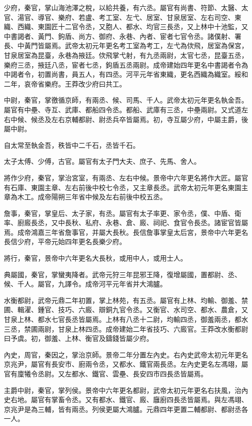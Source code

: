 \begin{pinyinscope}
少府，秦官，掌山海池澤之稅，以給共養，有六丞。屬官有尚書、符節、太醫、太官、湯官、導官、樂府、若盧、考工室、左弋、居室、甘泉居室、左右司空、東織、西織、東園匠十二官令丞，又胞人、都水、均官三長丞，又上林中十池監，又中書謁者、黃門、鉤盾、尚方、御府、永巷、內者、宦者七官令丞。諸僕射、署長、中黃門皆屬焉。武帝太初元年更名考工室為考工，左弋為佽飛，居室為保宮，甘泉居室為昆臺，永巷為掖廷。佽飛掌弋射，有九丞兩尉，太官七丞，昆臺五丞，樂府三丞，掖廷八丞，宦者七丞，鉤盾五丞兩尉。成帝建始四年更名中書謁者令為中謁者令，初置尚書，員五人，有四丞。河平元年省東織，更名西織為織室。綏和二年，哀帝省樂府。王莽改少府曰共工。

中尉，秦官，掌徼循京師，有兩丞、候、司馬、千人。武帝太初元年更名執金吾。屬官有中壘、寺互、武庫、都船四令丞。都船、武庫有三丞，中壘兩尉。又式道左右中候、候丞及左右京輔都尉、尉丞兵卒皆屬焉。初，寺互屬少府，中屬主爵，後屬中尉。

自太常至執金吾，秩皆中二千石，丞皆千石。

太子太傅、少傅，古官。屬官有太子門大夫、庶子、先馬、舍人。

將作少府，秦官，掌治宮室，有兩丞、左右中候。景帝中六年更名將作大匠。屬官有石庫、東園主章、左右前後中校七令丞，又主章長丞。武帝太初元年更名東園主章為木工。成帝陽朔三年省中候及左右前後中校五丞。

詹事，秦官，掌皇后、太子家，有丞。屬官有太子率更、家令丞，僕、中盾、衛率、廚廄長丞，又中長秋、私府、永巷、倉、廄、祠祀、食官令長丞。諸宦官皆屬焉。成帝鴻嘉三年省詹事官，并屬大長秋。長信詹事掌皇太后宮，景帝中六年更名長信少府，平帝元始四年更名長樂少府。

將行，秦官，景帝中六年更名大長秋，或用中人，或用士人。

典屬國，秦官，掌蠻夷降者。武帝元狩三年昆邪王降，復增屬國，置都尉、丞、候、千人。屬官，九譯令。成帝河平元年省并大鴻臚。

水衡都尉，武帝元鼎二年初置，掌上林苑，有五丞。屬官有上林、均輸、御羞、禁圃、輯濯、鍾官、技巧、六廄、辯銅九官令丞。又衡官、水司空、都水、農倉，又甘泉上林、都水七官長丞皆屬焉。上林有八丞十二尉，均輸四丞，御羞兩丞，都水三丞，禁圃兩尉，甘泉上林四丞。成帝建始二年省技巧、六廄官。王莽改水衡都尉曰予虞。初，御羞、上林、衡官及鑄錢皆屬少府。

內史，周官，秦因之，掌治京師。景帝二年分置左內史。右內史武帝太初元年更名京兆尹，屬官有長安市、廚兩令丞，又都水、鐵官兩長丞。左內史更名左馮翊，屬官有廩犧令丞尉。又左都水、鐵官、雲壘、長安四市四長丞皆屬焉。

主爵中尉，秦官，掌列侯。景帝中六年更名都尉，武帝太初元年更名右扶風，治內史右地。屬官有掌畜令丞。又有都水、鐵官、廄、廱廚四長丞皆屬焉。與左馮翊、京兆尹是為三輔，皆有兩丞。列侯更屬大鴻臚。元鼎四年更置二輔都尉、都尉丞各一人。


\end{pinyinscope}
